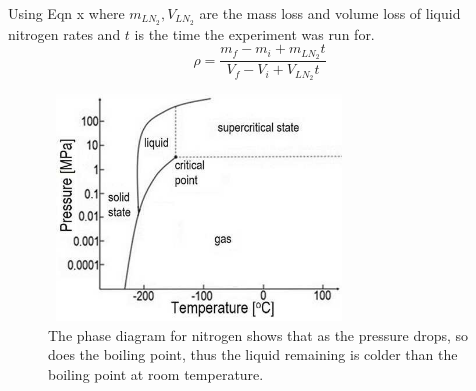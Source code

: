 \documentclass[12pt,notitlepage]{amsart}
\begin{document}
Using Eqn x where $m_{LN_{2}}, V_{LN_{2}}$ are the mass loss and volume loss of liquid nitrogen rates and $t$ is the time the experiment was run for. 
\begin{equation}
\rho = \frac{m_{f} - m_{i} + m_{LN_{2}}t} {V_{f} - V_{i} + V_{LN_{2}}t}
\end{equation}

\begin{figure}[h]
 \caption{The phase diagram for nitrogen shows that as the pressure drops, so does the boiling point, thus the liquid remaining is colder than the boiling point at room temperature. }
 \label{NPD}
 \centering
 \includegraphics[width = 8cm,height = 6cm]{N_PD} 
\end{figure}
\end{document}
